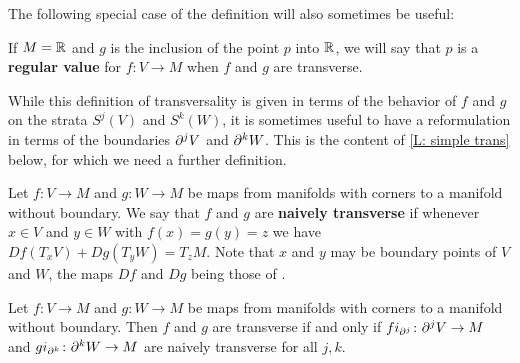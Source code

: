 The following special case of the definition will also sometimes be useful:

\begin{definition}\label{D: regular value}
If $M = \mathbb{R}$ and $g$ is the inclusion of the point $p$ into $\mathbb{R}$, we will say that $p$ is a \textbf{regular value} for $f \colon V \to M$ when $f$ and $g$ are transverse.
\end{definition}

While this definition of transversality is given in terms of the behavior of $f$ and $g$ on the strata $S^j(V)$ and $S^k(W)$, it is sometimes useful to have a reformulation in terms of the boundaries $\partial^j V$ and $\partial^kW$.
This is the content of \cref{L: simple trans} below, for which we need a further definition.

\begin{definition}\label{D: naive transversality}
Let $f \colon V \to M$ and $g \colon W \to M$ be maps from manifolds with corners to a manifold without boundary.
We say that $f$ and $g$ are \textbf{naively transverse} if whenever $x \in V$ and $y\in W$ with $f(x) = g(y) = z$ we have $Df(T_xV)+Dg(T_yW) = T_z M$. Note that $x$ and $y$ may be boundary points of $V$ and $W$, the maps $Df$ and $Dg$ being those of \cite[Definition 3.2]{Joy12}.
\end{definition}

\begin{lemma}\label{L: simple trans}
	Let $f \colon V \to M$ and $g \colon W \to M$ be maps from manifolds with corners to a manifold without boundary.
	Then $f$ and $g$ are transverse if and only if $fi_{\partial^j} \colon \partial^jV \to M$ and $gi_{\partial^k} \colon \partial^kW \to M$ are naively transverse for all $j,k$.
\end{lemma}

